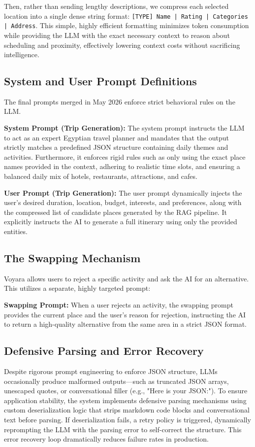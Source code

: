 Then, rather than sending lengthy descriptions, we compress each selected location into a single dense string format: \texttt{[TYPE] Name | Rating | Categories | Address}. This simple, highly efficient formatting minimizes token consumption while providing the LLM with the exact necessary context to reason about scheduling and proximity, effectively lowering context costs without sacrificing intelligence.

\subsection{System and User Prompt Definitions}
The final prompts merged in May 2026 enforce strict behavioral rules on the LLM.

\textbf{System Prompt (Trip Generation):}
The system prompt instructs the LLM to act as an expert Egyptian travel planner and mandates that the output strictly matches a predefined JSON structure containing daily themes and activities. Furthermore, it enforces rigid rules such as only using the exact place names provided in the context, adhering to realistic time slots, and ensuring a balanced daily mix of hotels, restaurants, attractions, and cafes.

\textbf{User Prompt (Trip Generation):}
The user prompt dynamically injects the user's desired duration, location, budget, interests, and preferences, along with the compressed list of candidate places generated by the RAG pipeline. It explicitly instructs the AI to generate a full itinerary using only the provided entities.

\subsection{The Swapping Mechanism}
Voyara allows users to reject a specific activity and ask the AI for an alternative. This utilizes a separate, highly targeted prompt:

\textbf{Swapping Prompt:}
When a user rejects an activity, the swapping prompt provides the current place and the user's reason for rejection, instructing the AI to return a high-quality alternative from the same area in a strict JSON format.

\subsection{Defensive Parsing and Error Recovery}
Despite rigorous prompt engineering to enforce JSON structure, LLMs occasionally produce malformed outputs---such as truncated JSON arrays, unescaped quotes, or conversational filler (e.g., "Here is your JSON:"). To ensure application stability, the system implements defensive parsing mechanisms using custom deserialization logic that strips markdown code blocks and conversational text before parsing. If deserialization fails, a retry policy is triggered, dynamically reprompting the LLM with the parsing error to self-correct the structure. This error recovery loop dramatically reduces failure rates in production.

